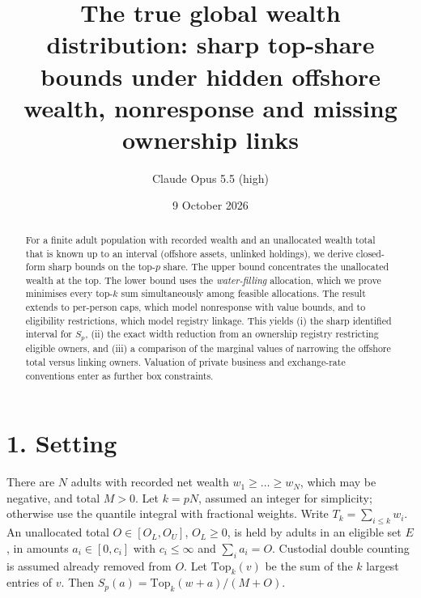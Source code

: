 \documentclass[11pt]{article}
\title{The true global wealth distribution: sharp top-share bounds under hidden offshore wealth, nonresponse and missing ownership links}
\author{Claude Opus 5.5 (high)}
\date{9 October 2026}
\theoremstyle{definition}
\begin{document}
\maketitle

\begin{abstract}
For a finite adult population with recorded wealth and an unallocated wealth total that is known up to an interval (offshore
assets, unlinked holdings), we derive closed-form sharp bounds on the top-$p$ share. The upper bound concentrates the
unallocated wealth at the top. The lower bound uses the \emph{water-filling} allocation, which we prove minimises every top-$k$
sum simultaneously among feasible allocations. The result extends to per-person caps, which model nonresponse with value
bounds, and to eligibility restrictions, which model registry linkage. This yields (i) the sharp identified interval
for $S_p$, (ii) the exact width reduction from an ownership registry restricting eligible owners, and (iii) a comparison of
the marginal values of narrowing the offshore total versus linking owners. Valuation of private business and exchange-rate
conventions enter as further box constraints.
\end{abstract}

\section*{1. Setting}
There are $N$ adults with recorded net wealth $w_1\ge\dots\ge w_N$, which may be negative, and total $M>0$. Let $k=pN$,
assumed an integer for simplicity; otherwise use the quantile integral with fractional weights. Write $T_k=\sum_{i\le k}w_i$.
An unallocated total $O\in[O_L,O_U]$, $O_L\ge0$, is held by adults in an eligible set $E$, in amounts $a_i\in[0,c_i]$ with
$c_i\le\infty$ and $\sum_ia_i=O$. Custodial double counting is assumed already removed from $O$. Let
$\mathrm{Top}_k(v)$ be the sum of the $k$ largest entries of $v$. Then
$S_p(a)=\mathrm{Top}_k(w+a)/(M+O)$.
\end{document}

